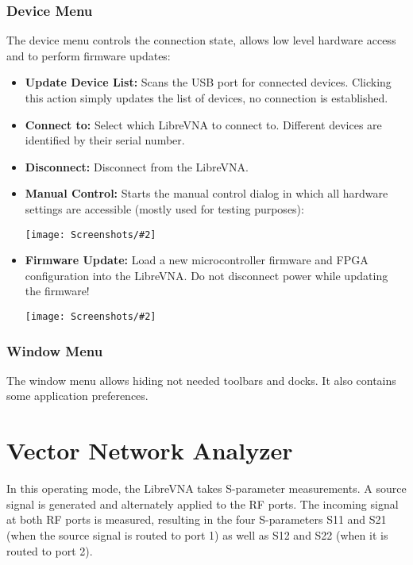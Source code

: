 \documentclass[a4paper,11pt]{article}
\newcommand{\vna}{LibreVNA}
\newcommand{\screenshot}[2]{\begin{center}
\texttt{[image: Screenshots/\#2]}
\end{center}}
\begin{document}
\subsubsection{Device Menu}
The device menu controls the connection state, allows low level hardware access and to perform firmware updates:
\begin{itemize}
\item \textbf{Update Device List:} Scans the USB port for connected devices. Clicking this action simply updates the list of devices, no connection is established.
\item \textbf{Connect to:} Select which \vna{} to connect to. Different devices are identified by their serial number.
\item \textbf{Disconnect:} Disconnect from the \vna{}.
\item \textbf{Manual Control:} Starts the manual control dialog in which all hardware settings are accessible (mostly used for testing purposes):
\screenshot{1.0}{DialogManualControl.png}
\item \textbf{Firmware Update:} Load a new microcontroller firmware and FPGA configuration into the \vna{}. Do not disconnect power while updating the firmware!
\screenshot{0.6}{DialogFirmwareUpdate.png}
\end{itemize}

\subsubsection{Window Menu}
\label{menu:window}
The window menu allows hiding not needed toolbars and docks. It also contains some application preferences.

\section{Vector Network Analyzer}
In this operating mode, the \vna{} takes S-parameter measurements. A source signal is generated and alternately applied to the RF ports. The incoming signal at both RF ports is measured, resulting in the four S-parameters S11 and S21 (when the source signal is routed to port 1) as well as S12 and S22 (when it is routed to port 2).
\end{document}
